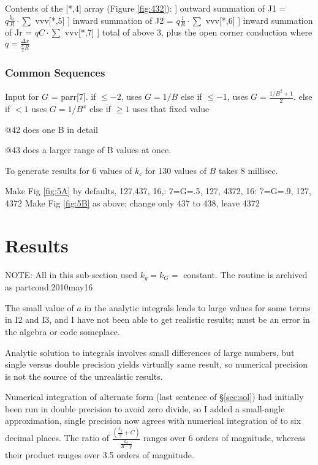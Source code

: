 \documentclass{article}
\begin{document}
 Contents of the  [*,4] array (Figure \ref{fig:432}): 
] outward summation of J1 = $q \frac{k_c}{R} \cdot \sum $ vvv[*,5] 
] inward summation of J2 = $q \frac{1}{R} \cdot \sum $ vvv[*,6]
] inward summation of Jr = $q C \cdot \sum $ vvv[*,7]
] total of above 3, plus the open corner conduction 
\qii where $q= \frac{\Delta x}{ \frac{\pi}{2} R}$ 

\subsubsection{Common Sequences} %
Input for $G$ = parr[7]. 
\qi if $\leq -2$, uses  $G=1/B$
\qi else if $\leq -1$, uses $G=\frac{1/B^2+1}{2}$.
\qi else if $<1$ uses $G=1/B^x$
\qi else if $\geq 1$ uses that fixed value

@42 does one B in detail

@43 does a larger range of B values at once.

To generate results for 6 values of $k_c$ for 130 values of $B$ takes 8 millisec.

Make Fig \ref{fig:5A} by defaults, 127,437, 16,: 7=G=.5, 127, 4372, 16: 7=G=.9, 127, 4372
\qi Make  Fig \ref{fig:5B} as above; change only 437 to 438, leave 4372

\section {Results \label{sec:results}} %

NOTE: All in this sub-section used $k_g = k_G=$ constant. The routine is
archived as partcond.2010may16

The small value of $a$ in the analytic integrals leads to large values for some
terms in I2 and I3, and I have not been able to get realistic results; must be
an error in the algebra or code someplace.

Analytic solution to integrals involves small differences of large numbers, but
single versus double precision yields virtually same result, so numerical
precision is not the source of the unrealistic results.

Numerical integration of alternate form (last sentence of \S \ref{sec:sol}) had
initially been run in double precision to avoid zero divide, so I added a
small-angle approximation, single precision now agrees with numerical
integration of  to six decimal places. The ratio of $\frac{\left(
\frac{k_g}{y} +C \right)}{\frac{k_h}{R-y}}$ ranges over 6 orders of magnitude,
whereas their product ranges over 3.5 orders of magnitude.
\end{document}
